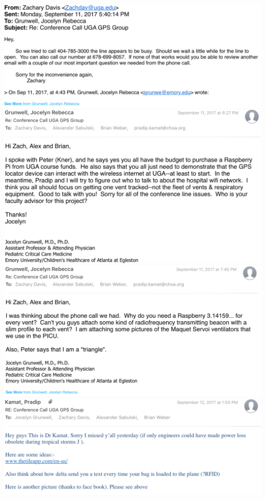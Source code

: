 \documentclass[12pt]{article}
\begin{document}
\begin{center}
		\includegraphics[scale=0.8]{5.png}\\
		\includegraphics[scale=0.8]{6.png}\\
		\includegraphics[scale=0.8]{7.png}\\
		\includegraphics[scale=0.8]{8.png}\\

\end{center}
\end{document}
